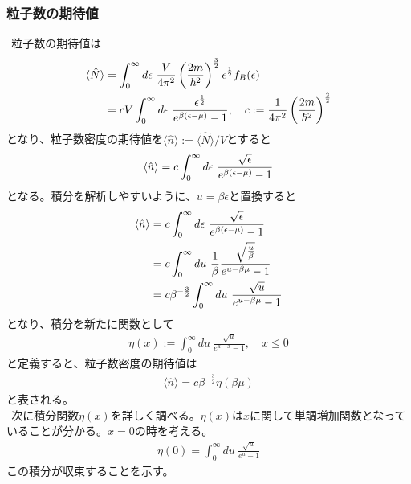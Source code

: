 \documentclass{jsarticle}  %
\numberwithin{equation}{section} %
\numberwithin{figure}{section}
\begin{document}
\subsubsection{粒子数の期待値}
    $\ \ $粒子数の期待値は
    \begin{align}
        \langle \hat{N} \rangle &= \int_0^{\infty} d\epsilon\ \frac{V}{4 \pi^2} \left( \frac{2m}{\hbar^2} \right)^{\frac{3}{2}} \epsilon^\frac{1}{2} f_B(\epsilon) \notag \\
        &= cV \int_0^{\infty} d\epsilon\  \frac{\epsilon^\frac{1}{2}}{e^{\beta (\epsilon - \mu)} - 1}, \quad c := \frac{1}{4 \pi^2} \left( \frac{2m}{\hbar^2} \right)^{\frac{3}{2}} \notag 
    \end{align}
    となり、粒子数密度の期待値を$\langle \hat{n} \rangle := \langle \hat{N} \rangle / V$とすると
    \begin{align}
        \langle \hat{n} \rangle = c \int_0^{\infty} d\epsilon\  \frac{\sqrt{\epsilon}}{e^{\beta (\epsilon - \mu)} - 1} \notag 
    \end{align}
    となる。積分を解析しやすいように、$u = \beta \epsilon$と置換すると
    \begin{align}
                \langle \hat{n} \rangle &= c \int_0^{\infty} d\epsilon\  \frac{\sqrt{\epsilon}}{e^{\beta (\epsilon - \mu)} - 1}  \notag \\
                &= c \int_0^{\infty} du\ \frac{1}{\beta} \frac{\sqrt{\frac{u}{\beta}}}{e^{u - \beta \mu} - 1} \notag \\
                &= c \beta^{-\frac{3}{2}}\int_0^{\infty} du\ \frac{\sqrt{u}}{e^{u - \beta \mu} - 1} \notag 
    \end{align}
    となり、積分を新たに関数として
    \begin{align}
        \eta (x) := \int_0^{\infty} du\ \frac{\sqrt{u}}{e^{u - x} - 1},\quad x \le 0
    \end{align}
    と定義すると、粒子数密度の期待値は
    \begin{align}
        \langle \hat{n} \rangle = c \beta^{-\frac{3}{2}} \eta (\beta \mu)
    \end{align}
    と表される。\\
    $\ \ $次に積分関数$\eta(x)$を詳しく調べる。$\eta (x)$は$x$に関して単調増加関数となっていることが分かる。$x =0$の時を考える。
    \begin{align}
        \eta (0) = \int_0^{\infty} du\ \frac{\sqrt{u}}{e^{u} - 1}
    \end{align}
    この積分が収束することを示す。\\
\end{document}
